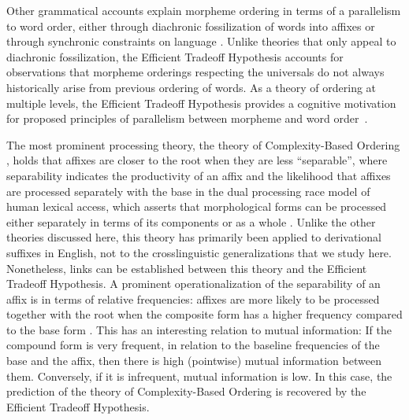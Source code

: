 \documentclass[man]{apa7}
\newcommand{\citep}{\parencite}
\newcommand\mhahn[1]{{\color{red}(#1)}}
\begin{document}
Other grammatical accounts explain morpheme ordering in terms of a parallelism to word order, either through diachronic fossilization of words into affixes or through synchronic constraints on language \citep{givon1971historical,venneman1973explanation,baker1985the}.
Unlike theories that only appeal to diachronic fossilization, the Efficient Tradeoff Hypothesis accounts for observations that morpheme orderings respecting the universals do not always historically arise from previous ordering of words.
As a theory of ordering at multiple levels, the Efficient Tradeoff Hypothesis  provides a cognitive motivation for proposed principles of parallelism between morpheme and word order~\citep{baker1985the}.


The most prominent processing theory, the theory of Complexity-Based Ordering \citep{hay2002speech,plag2002the,hay2004what,hay2005shifting,plag2009suffix},
holds that affixes are closer to the root when they are less ``separable'', where separability indicates the productivity of an affix and the likelihood that affixes are processed separately with the base in the dual processing race model of human lexical access, which asserts that morphological forms can be processed either separately in terms of its components or as a whole  \citep{baayen-frequency-1993}.
Unlike the other theories discussed here, this theory has primarily been applied to derivational suffixes in English, not to the crosslinguistic generalizations that we study here.
Nonetheless, links can be established between this theory and the Efficient Tradeoff Hypothesis.
A prominent operationalization of the separability of an affix is in terms of relative frequencies:
affixes are more likely to be processed together with the root when the composite form has a higher frequency compared to the base form \citep{hay2001lexical}. %
This has an interesting relation to mutual information: 
If the compound form is very frequent, in relation to the baseline frequencies of the base and the affix, then there is high (pointwise) mutual information between them.
Conversely, if it is infrequent, mutual information is low.
In this case, the prediction of the theory of Complexity-Based Ordering is recovered by the Efficient Tradeoff Hypothesis.
\end{document}
